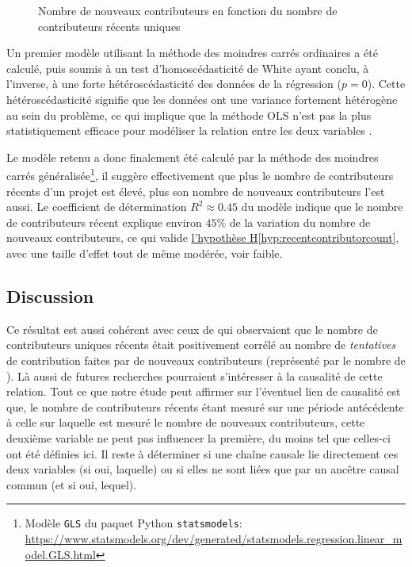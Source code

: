 \begin{figure}
    

    

    \caption{Nombre de nouveaux contributeurs en fonction du nombre de contributeurs récents uniques}
    \label{fig:contributorCount}
\end{figure}

Un premier modèle utilisant la méthode des moindres carrés ordinaires a été calculé, puis soumis à un test
d'homoscédasticité de White ayant conclu, à l'inverse, à une forte hétéroscédasticité des données de la
régression ($p = 0$). Cette hétéroscédasticité signifie que les données ont une variance fortement hétérogène
au sein du problème, ce qui implique que la méthode OLS n'est pas la plus statistiquement efficace pour
modéliser la relation entre les deux variables \parencite{GLS-2021}.

Le modèle retenu a donc finalement été calculé par la méthode des moindres carrés généralisée\footnote{Modèle
\texttt{GLS} du paquet Python \texttt{statsmodels}:
\url{https://www.statsmodels.org/dev/generated/statsmodels.regression.linear_model.GLS.html}}, il suggère
effectivement que plus le nombre de contributeurs récents d'un projet est élevé, plus son nombre de nouveaux
contributeurs l'est aussi. Le coefficient de détermination $R^2 \approx 0.45$ du modèle indique que le nombre
de contributeurs récent explique environ $45\%$ de la variation du nombre de nouveaux contributeurs, ce qui
valide \hyperref[hyp:recentcontributorcount]{l'hypothèse H\ref*{hyp:recentcontributorcount}}, avec une taille
d'effet tout de même modérée, voir faible.

\subsection{Discussion}

Ce résultat est aussi cohérent avec ceux de \textcite[p.~12-13,16]{signals-2019} qui observaient que le nombre
de contributeurs uniques récents était positivement corrélé au nombre de \emph{tentatives} de contribution
faites par de nouveaux contributeurs (représenté par le nombre de ). Là aussi de futures
recherches pourraient s'intéresser à la causalité de cette relation. Tout ce que notre étude peut affirmer sur
l'éventuel lien de causalité est que, le nombre de contributeurs récents étant mesuré sur une période
antécédente à celle sur laquelle est mesuré le nombre de nouveaux contributeurs, cette deuxième variable ne
peut pas influencer la première, du moins tel que celles-ci ont été définies ici. Il reste à déterminer si une
chaîne causale lie directement ces deux variables (si oui, laquelle) ou si elles ne sont liées que par un
ancêtre causal commun (et si oui, lequel).

